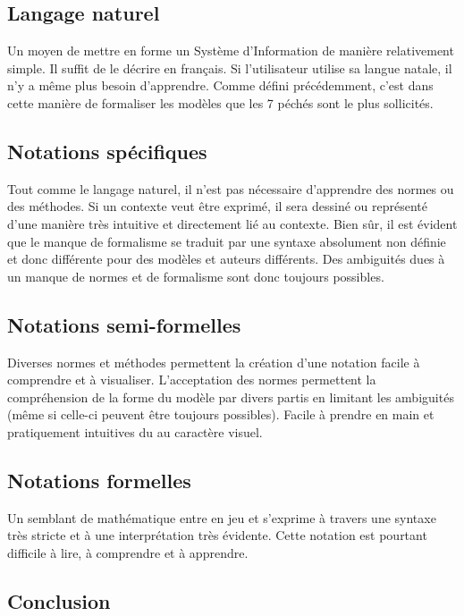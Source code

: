 \subsection{Langage naturel}

Un moyen de mettre en forme un Système d'Information de manière relativement simple. Il suffit de le décrire en français. Si l'utilisateur utilise sa langue natale, il n'y a même plus besoin d'apprendre. Comme défini précédemment, c'est dans cette manière de formaliser les modèles que les 7 péchés sont le plus sollicités.

\subsection{Notations spécifiques}

Tout comme le langage naturel, il n'est pas nécessaire d'apprendre des normes ou des méthodes. Si un contexte veut être exprimé, il sera dessiné ou représenté d'une manière très intuitive et directement lié au contexte. Bien sûr, il est évident que le manque de formalisme se traduit par une syntaxe absolument non définie et donc différente pour des modèles et auteurs différents. Des ambiguités dues à un manque de normes et de formalisme sont donc toujours possibles.

\subsection{Notations semi-formelles}

Diverses normes et méthodes permettent la création d'une notation facile à comprendre et à visualiser. L'acceptation des normes permettent la compréhension de la forme du modèle par divers partis en limitant les ambiguités (même si celle-ci peuvent être toujours possibles). Facile à prendre en main et pratiquement intuitives du au caractère visuel.

\subsection{Notations formelles}

Un semblant de mathématique entre en jeu et s'exprime à travers une syntaxe très stricte et à une interprétation très évidente. Cette notation est pourtant difficile à lire, à comprendre et à apprendre.

\subsection{Conclusion}

